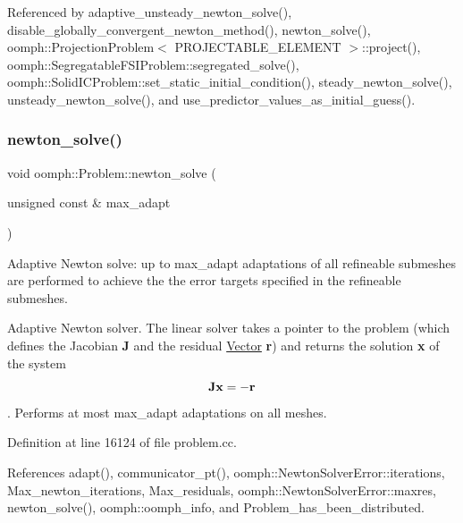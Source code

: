 Referenced by adaptive\+\_\+unsteady\+\_\+newton\+\_\+solve(), disable\+\_\+globally\+\_\+convergent\+\_\+newton\+\_\+method(), newton\+\_\+solve(), oomph\+::\+Projection\+Problem$<$ P\+R\+O\+J\+E\+C\+T\+A\+B\+L\+E\+\_\+\+E\+L\+E\+M\+E\+N\+T $>$\+::project(), oomph\+::\+Segregatable\+F\+S\+I\+Problem\+::segregated\+\_\+solve(), oomph\+::\+Solid\+I\+C\+Problem\+::set\+\_\+static\+\_\+initial\+\_\+condition(), steady\+\_\+newton\+\_\+solve(), unsteady\+\_\+newton\+\_\+solve(), and use\+\_\+predictor\+\_\+values\+\_\+as\+\_\+initial\+\_\+guess().

\mbox{\label{classoomph_1_1Problem_a4a5a30c124a14f32368f9607b7c8bf34}} 
\subsubsection{\texorpdfstring{newton\+\_\+solve()}{newton\_solve()}\hspace{0.1cm}{\footnotesize\ttfamily [2/2]}}
{\footnotesize\ttfamily void oomph\+::\+Problem\+::newton\+\_\+solve (\begin{DoxyParamCaption}\item[{unsigned const \&}]{max\+\_\+adapt }\end{DoxyParamCaption})}



Adaptive Newton solve\+: up to max\+\_\+adapt adaptations of all refineable submeshes are performed to achieve the the error targets specified in the refineable submeshes. 

Adaptive Newton solver. The linear solver takes a pointer to the problem (which defines the Jacobian {\bfseries J} and the residual \hyperlink{classoomph_1_1Vector}{Vector} {\bfseries r}) and returns the solution {\bfseries x} of the system \[ {\bf J} {\bf x} = - \bf{r} \]. Performs at most max\+\_\+adapt adaptations on all meshes. 

Definition at line 16124 of file problem.\+cc.



References adapt(), communicator\+\_\+pt(), oomph\+::\+Newton\+Solver\+Error\+::iterations, Max\+\_\+newton\+\_\+iterations, Max\+\_\+residuals, oomph\+::\+Newton\+Solver\+Error\+::maxres, newton\+\_\+solve(), oomph\+::oomph\+\_\+info, and Problem\+\_\+has\+\_\+been\+\_\+distributed.

